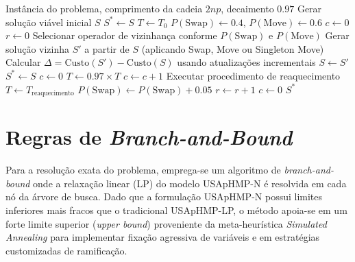 \begin{algorithm}[H]
\caption{Meta-heurística de \textit{Simulated Annealing}}
\label{alg:sa}
\begin{algorithmic}[1]
\Require Instância do problema, comprimento da cadeia $2np$, decaimento $0.97$
\State Gerar solução viável inicial $S$
\State $S^* \gets S$ 
\State $T \gets T_0$ 
\State $P(\text{Swap}) \gets 0.4$, $P(\text{Move}) \gets 0.6$
\State $c \gets 0$ 
\State $r \gets 0$ 
 
     
            \State Selecionar operador de vizinhança conforme $P(\text{Swap})$ e $P(\text{Move})$
            \State Gerar solução vizinha $S'$ a partir de $S$ (aplicando Swap, Move ou Singleton Move)
            \State Calcular $\Delta = \text{Custo}(S') - \text{Custo}(S)$ usando atualizações incrementais
                \State $S \gets S'$ 
                    \State $S^* \gets S$ 
                    \State $c \gets 0$ 
                \EndIf
            \EndIf
        \EndFor
        \State $T \gets 0.97 \times T$ 
        \State $c \gets c + 1$
    \EndWhile
    \State Executar procedimento de reaquecimento
    \State $T \gets T_{\text{reaquecimento}}$
    \State $P(\text{Swap}) \gets P(\text{Swap}) + 0.05$ 
    \State $r \gets r + 1$
    \State $c \gets 0$
\EndWhile
\State \Return $S^*$
\end{algorithmic}
\end{algorithm}

\section{Regras de \textit{Branch-and-Bound}}

Para a resolução exata do problema, emprega-se um algoritmo de \textit{branch-and-bound} onde a relaxação linear (LP) do modelo USApHMP-N é resolvida em cada nó da árvore de busca. Dado que a formulação USApHMP-N possui limites inferiores mais fracos que o tradicional USApHMP-LP, o método apoia-se em um forte limite superior (\textit{upper bound}) proveniente da meta-heurística \textit{Simulated Annealing} para implementar fixação agressiva de variáveis e em estratégias customizadas de ramificação.

